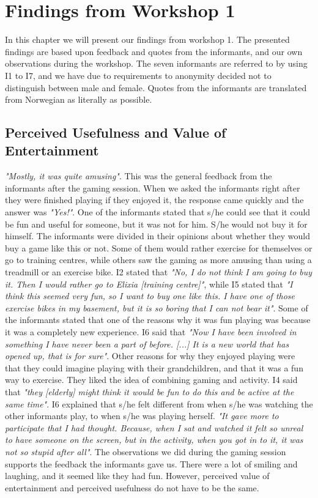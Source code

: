 \chapter{Findings from Workshop 1}
In this chapter we will present our findings from workshop 1. The presented findings are based upon feedback and quotes from the informants, and our own observations during the workshop. The seven informants are referred to by using I1 to I7, and we have due to requirements to anonymity decided not to distinguish between male and female. Quotes from the informants are translated from Norwegian as literally as possible. 

\section{Perceived Usefulness and Value of Entertainment}
\emph{"Mostly, it was quite amusing"}. This was the general feedback from the informants after the gaming session. When we asked the informants right after they were finished playing if they enjoyed it, the response came quickly and the answer was \emph{"Yes!"}. One of the informants stated that s/he could see that it could be fun and useful for someone, but it was not for him. S/he would not buy it for himself. The informants were divided in their opinions about whether they would buy a game like this or not. Some of them would rather exercise for themselves or go to training centres, while others saw the gaming as more amusing than using a treadmill or an exercise bike. I2 stated that \emph{"No, I do not think I am going to buy it. Then I would rather go to Elixia [training centre]"}, while I5 stated that \emph{"I think this seemed very fun, so I want to buy one like this. I have one of those exercise bikes in my basement, but it is so boring that I can not bear it"}.  Some of the informants stated that one of the reasons why it was fun playing was because it was a completely new experience. I6 said that \emph{"Now I have been involved in something I have never been a part of before. [...] It is a new world that has opened up, that is for sure"}. Other reasons for why they enjoyed playing were that they could imagine playing with their grandchildren, and that it was a fun way to exercise. They liked the idea of combining gaming and activity. I4 said that \emph{"they [elderly] might think it would be fun to do this and be active at the same time"}. I6 explained that s/he felt different from when s/he was watching the other informants play, to when s/he was playing herself. \emph{"It gave more to participate that I had thought. Because, when I sat and watched it felt so unreal to have someone on the screen, but in the activity, when you got in to it, it was not so stupid after all"}. The observations we did during the gaming session supports the feedback the informants gave us. There were a lot of smiling and laughing, and it seemed like they had fun. However, perceived value of entertainment and perceived usefulness do not have to be the same. 

